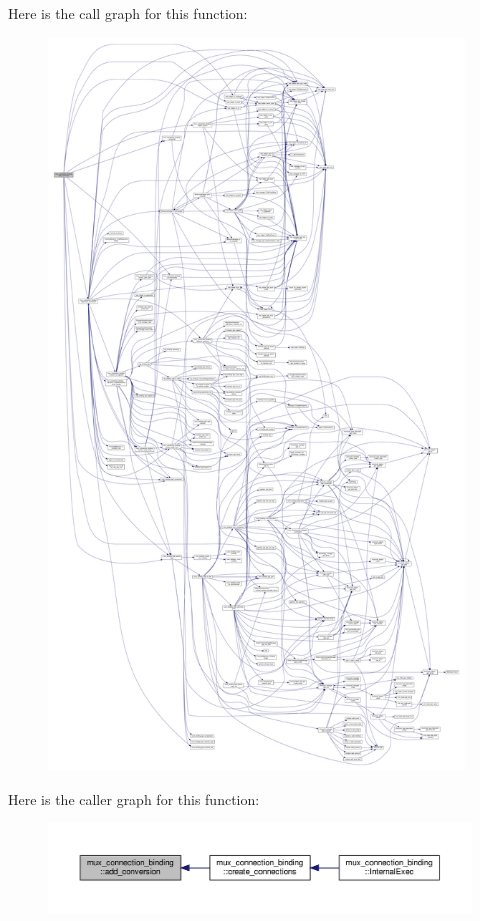 Here is the call graph for this function\+:
\nopagebreak
\begin{figure}[H]
\begin{center}
\leavevmode
\includegraphics[height=550pt]{d7/d1e/classmux__connection__binding_aa34c2f95532bff6fa7d281583bad6a3f_cgraph}
\end{center}
\end{figure}
Here is the caller graph for this function\+:
\nopagebreak
\begin{figure}[H]
\begin{center}
\leavevmode
\includegraphics[width=350pt]{d7/d1e/classmux__connection__binding_aa34c2f95532bff6fa7d281583bad6a3f_icgraph}
\end{center}
\end{figure}
\mbox{\label{classmux__connection__binding_ac5426fb29f88f4e8a2b1a3dc3cb7be9a}} 
